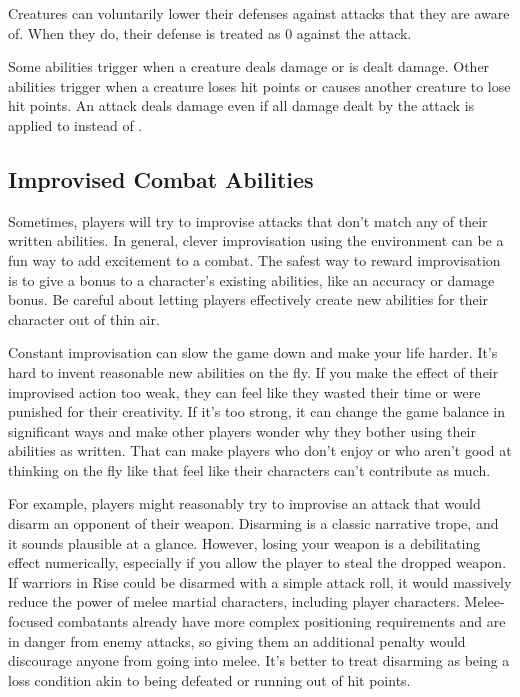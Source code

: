   Creatures can voluntarily lower their defenses against attacks that they are aware of.
  When they do, their defense is treated as 0 against the attack.

  Some abilities trigger when a creature deals damage or is dealt damage.
  Other abilities trigger when a creature loses hit points or causes another creature to lose hit points.
  An attack deals damage even if all damage dealt by the attack is applied to  instead of .

  \subsection{Improvised Combat Abilities}
    Sometimes, players will try to improvise attacks that don't match any of their written abilities.
    In general, clever improvisation using the environment can be a fun way to add excitement to a combat.
    The safest way to reward improvisation is to give a bonus to a character's existing abilities, like an accuracy or damage bonus.
    Be careful about letting players effectively create new abilities for their character out of thin air.

    Constant improvisation can slow the game down and make your life harder.
    It's hard to invent reasonable new abilities on the fly.
    If you make the effect of their improvised action too weak, they can feel like they wasted their time or were punished for their creativity.
    If it's too strong, it can change the game balance in significant ways and make other players wonder why they bother using their abilities as written.
    That can make players who don't enjoy or who aren't good at thinking on the fly like that feel like their characters can't contribute as much.

    For example, players might reasonably try to improvise an attack that would disarm an opponent of their weapon.
    Disarming is a classic narrative trope, and it sounds plausible at a glance.
    However, losing your weapon is a debilitating effect numerically, especially if you allow the player to steal the dropped weapon.
    If warriors in Rise could be disarmed with a simple attack roll, it would massively reduce the power of melee martial characters, including player characters.
    Melee-focused combatants already have more complex positioning requirements and are in danger from enemy attacks, so giving them an additional penalty would discourage anyone from going into melee.
    It's better to treat disarming as being a loss condition akin to being defeated or running out of hit points.

